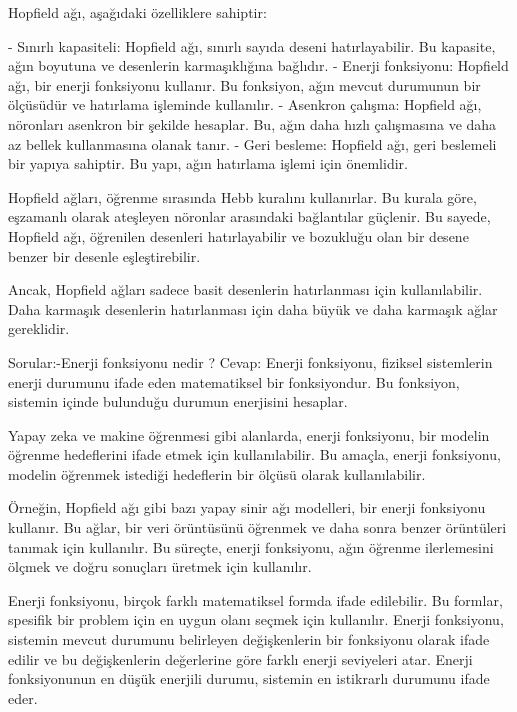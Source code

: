 \documentclass[11pt]{article}
\begin{document}
Hopfield ağı, aşağıdaki özelliklere sahiptir:

    - Sınırlı kapasiteli: Hopfield ağı, sınırlı sayıda deseni hatırlayabilir. 
    Bu kapasite, ağın boyutuna ve desenlerin karmaşıklığına bağlıdır.\newline
    - Enerji fonksiyonu: Hopfield ağı, bir enerji fonksiyonu kullanır. Bu fonksiyon, ağın mevcut durumunun bir ölçüsüdür ve hatırlama işleminde kullanılır.\newline
    - Asenkron çalışma: Hopfield ağı, nöronları asenkron bir şekilde hesaplar. Bu, ağın daha hızlı çalışmasına ve daha az bellek kullanmasına olanak tanır.\newline
   - Geri besleme: Hopfield ağı, geri beslemeli bir yapıya sahiptir. Bu yapı, ağın hatırlama işlemi için önemlidir.

Hopfield ağları, öğrenme sırasında Hebb kuralını kullanırlar. Bu kurala göre, eşzamanlı olarak ateşleyen nöronlar arasındaki bağlantılar güçlenir. Bu sayede, Hopfield ağı, öğrenilen desenleri hatırlayabilir ve bozukluğu olan bir desene benzer bir desenle eşleştirebilir.

Ancak, Hopfield ağları sadece basit desenlerin hatırlanması için kullanılabilir. Daha karmaşık desenlerin hatırlanması için daha büyük ve daha karmaşık ağlar gereklidir.

Sorular:-Enerji fonksiyonu nedir ?\newline
Cevap: Enerji fonksiyonu, fiziksel sistemlerin enerji durumunu ifade eden matematiksel bir fonksiyondur. Bu fonksiyon, sistemin içinde bulunduğu durumun enerjisini hesaplar.

Yapay zeka ve makine öğrenmesi gibi alanlarda, enerji fonksiyonu, bir modelin öğrenme hedeflerini ifade etmek için kullanılabilir. Bu amaçla, enerji fonksiyonu, modelin öğrenmek istediği hedeflerin bir ölçüsü olarak kullanılabilir.

Örneğin, Hopfield ağı gibi bazı yapay sinir ağı modelleri, bir enerji fonksiyonu kullanır. Bu ağlar, bir veri örüntüsünü öğrenmek ve daha sonra benzer örüntüleri tanımak için kullanılır. Bu süreçte, enerji fonksiyonu, ağın öğrenme ilerlemesini ölçmek ve doğru sonuçları üretmek için kullanılır.

Enerji fonksiyonu, birçok farklı matematiksel formda ifade edilebilir. Bu formlar, spesifik bir problem için en uygun olanı seçmek için kullanılır. Enerji fonksiyonu, sistemin mevcut durumunu belirleyen değişkenlerin bir fonksiyonu olarak ifade edilir ve bu değişkenlerin değerlerine göre farklı enerji seviyeleri atar. Enerji fonksiyonunun en düşük enerjili durumu, sistemin en istikrarlı durumunu ifade eder.
\end{document}
